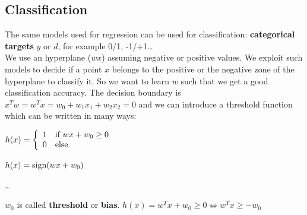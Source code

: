 \documentclass[10pt]{report}
\begin{document}
\subsection{Classification} The same models used for regression can be used for classification: \textbf{categorical targets} $y$ or $d$, for example 0/1, -1/+1\ldots\\
We use an hyperplane ($wx$) assuming negative or positive values. We exploit such models to decide if a point $x$ belongs to the positive or the negative zone of the hyperplane to classify it. So we want to learn $w$ such that we get a good classification accuracy. The decision boundary is $x^Tw = w^Tx = w_0 + w_1x_1 + w_2x_2 = 0$ and we can introduce a threshold function which can be written in many ways: \begin{list}{}{}
	\item $h(x) = \left\{\begin{array}{c l}
	1 & \hbox{if }wx + w_0 \geq 0\\
	0 & \hbox{else}
\end{array}	 \right.$
	\item $h(x) = \hbox{sign}(wx + w_0)$
	\item \ldots
\end{list}
$w_0$ is called \textbf{threshold} or \textbf{bias}. $h(x) = w^Tx + w_0 \geq 0 \Leftrightarrow w^Tx \geq -w_0$
\end{document}
